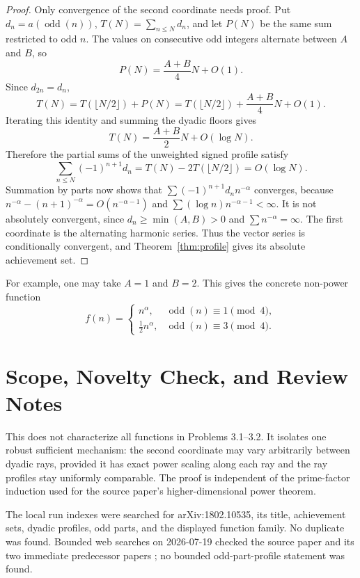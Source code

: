\documentclass[11pt]{article}
\newcommand{\odd}{\operatorname{odd}}
\begin{document}
\begin{proof}
Only convergence of the second coordinate needs proof.  Put
\(d_n=a(\odd(n))\), $T(N)=\sum_{n\leq N}d_n$, and let $P(N)$ be the
same sum restricted to odd $n$.  The values on consecutive odd integers
alternate between $A$ and $B$, so
\[
  P(N)=\frac{A+B}{4}N+O(1).
\]
Since $d_{2n}=d_n$,
\[
  T(N)=T(\lfloor N/2\rfloor)+P(N)
      =T(\lfloor N/2\rfloor)+\frac{A+B}{4}N+O(1).
\]
Iterating this identity and summing the dyadic floors gives
\[
  T(N)=\frac{A+B}{2}N+O(\log N).
\]
Therefore the partial sums of the unweighted signed profile satisfy
\[
 \sum_{n\leq N}(-1)^{n+1}d_n
 =T(N)-2T(\lfloor N/2\rfloor)=O(\log N).
\]
Summation by parts now shows that
\(\sum (-1)^{n+1}d_n n^{-\alpha}\) converges, because
\(n^{-\alpha}-(n+1)^{-\alpha}=O(n^{-\alpha-1})\) and
\(\sum (\log n)n^{-\alpha-1}<\infty\).  It is not absolutely convergent,
since $d_n\geq\min(A,B)>0$ and \(\sum n^{-\alpha}=\infty\).
The first coordinate is the alternating harmonic series.  Thus the vector
series is conditionally convergent, and Theorem~\ref{thm:profile} gives its
absolute achievement set.
\end{proof}

For example, one may take $A=1$ and $B=2$.  This gives the concrete
non-power function
\[
 f(n)=
 \begin{cases}
  n^\alpha,&\odd(n)\equiv1\pmod4,\\
  \tfrac12 n^\alpha,&\odd(n)\equiv3\pmod4.
 \end{cases}
\]

\section*{Scope, Novelty Check, and Review Notes}

This does not characterize all functions in Problems 3.1--3.2.  It isolates
one robust sufficient mechanism: the second coordinate may vary arbitrarily
between dyadic rays, provided it has exact power scaling along each ray and
the ray profiles stay uniformly comparable.  The proof is independent of the
prime-factor induction used for the source paper's higher-dimensional power
theorem.

The local run indexes were searched for arXiv:1802.10535, its title,
achievement sets, dyadic profiles, odd parts, and the displayed function
family.  No duplicate was found.  Bounded web searches on 2026-07-19 checked
the source paper and its two immediate predecessor papers
\cite{BartoszewiczGlabMarchwicki,GlabMarchwicki}; no bounded odd-part-profile
statement was found.
\end{document}
